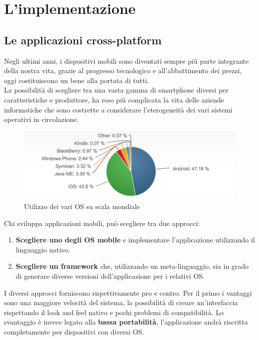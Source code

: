 \chapter{L'implementazione}

\section{Le applicazioni cross-platform}
Negli ultimi anni, i dispositivi mobili sono diventati sempre più parte integrante della nostra vita, grazie al progresso tecnologico e all'abbattimento dei prezzi, oggi costituiscono un bene alla portata di tutti. \\
La possibilità di scegliere tra una vasta gamma di smartphone diversi per caratteristiche e produttore, ha reso più complicata la vita delle aziende informatiche che sono costrette a considerare l'eterogeneità dei vari sistemi operativi in circolazione.\\
\begin{figure}[H]
	\centering
	\includegraphics[scale=0.7]{Implementazione/os.png}
	\caption{Utilizzo dei vari OS su scala mondiale}
	\label{fig:os_mobile}
\end{figure}
\newpage
Chi sviluppa applicazioni mobili, può scegliere tra due approcci:
\begin{enumerate}
\item \textbf{Scegliere uno degli OS mobile} e implementare l'applicazione utilizzando il linguaggio nativo.
\item \textbf{Scegliere un framework }che, utilizzando un meta-linguaggio, sia in grado di generare diverse versioni dell'applicazione per i relativi OS.
\end{enumerate}
I diversi approcci forniscono rispettivamente pro e contro. Per il primo i vantaggi sono una maggiore velocità del sistema, la possibilità di creare un'interfaccia rispettando il look and feel nativo e pochi problemi di compatibilità. Lo svantaggio è invece legato alla \textbf{bassa portabilità}, l'applicazione andrà riscritta completamente per dispositivi con diversi OS. \\
